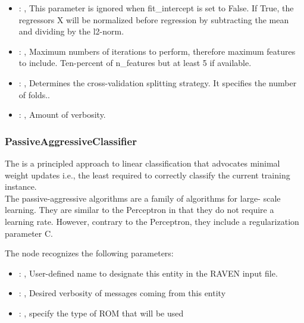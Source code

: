 \begin{itemize}
    \item {}: , 
      This parameter is ignored when fit\_intercept is set to False. If True,
      the regressors X will be normalized before regression by subtracting the mean and
      dividing by the l2-norm.

    \item {}: , 
      Maximum numbers of iterations to perform, therefore maximum
      features to include. Ten-percent of n\_features but at least 5 if available.

    \item {}: , 
      Determines the cross-validation splitting strategy.
      It specifies the number of folds..

    \item {}: , 
      Amount of verbosity.
  \end{itemize}


\subsubsection{PassiveAggressiveClassifier}
  The                          is a principled approach to
  linear                         classification that advocates minimal weight updates i.e., the
  least required                         to correctly classify the current training instance.
  \\The passive-aggressive algorithms are a family of algorithms for                         large-
  scale learning. They are similar to the Perceptron in that they                         do not
  require a learning rate. However, contrary to the Perceptron,                         they include
  a regularization parameter C.

  The  node recognizes the following parameters:
    \begin{itemize}
      \item {}: , 
        User-defined name to designate this entity in the RAVEN input file.
      \item {}: , 
        Desired verbosity of messages coming from this entity
      \item {}: , 
        specify the type of ROM that will be used
  \end{itemize}

